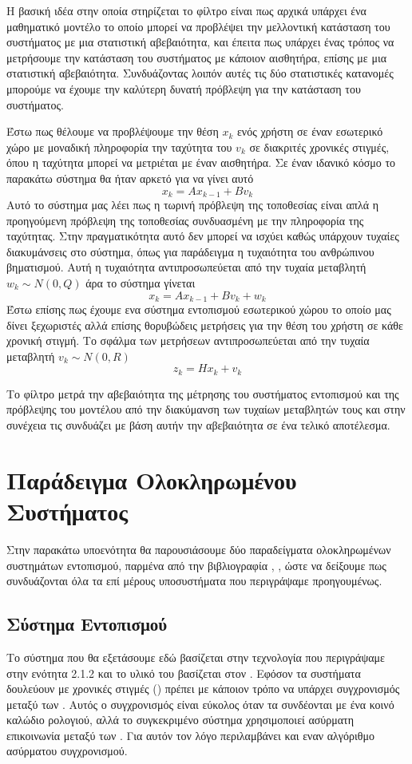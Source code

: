 Η βασική ιδέα στην οποία στηρίζεται το φίλτρο  είναι πως αρχικά υπάρχει ένα μαθηματικό μοντέλο το οποίο μπορεί να
προβλέψει την μελλοντική κατάσταση του συστήματος με μια στατιστική αβεβαιότητα, και έπειτα πως υπάρχει ένας τρόπος να μετρήσουμε την
κατάσταση του συστήματος με κάποιον αισθητήρα, επίσης με μια στατιστική αβεβαιότητα. Συνδυάζοντας λοιπόν αυτές τις δύο στατιστικές
κατανομές μπορούμε να έχουμε την καλύτερη δυνατή πρόβλεψη για την κατάσταση του συστήματος.

Έστω πως θέλουμε να προβλέψουμε την θέση \(x_k\) ενός χρήστη σε έναν εσωτερικό χώρο με μοναδική πληροφορία την ταχύτητα του \(v_k\) σε
διακριτές χρονικές στιγμές, όπου η ταχύτητα μπορεί να μετριέται με έναν αισθητήρα.
Σε έναν ιδανικό κόσμο το παρακάτω σύστημα θα ήταν αρκετό για να γίνει αυτό
\[x_k = Ax_{k-1} + Bv_k\]
Αυτό το σύστημα μας λέει πως η τωρινή πρόβλεψη της τοποθεσίας είναι απλά η προηγούμενη πρόβλεψη της τοποθεσίας συνδυασμένη με την
πληροφορία της ταχύτητας. Στην πραγματικότητα αυτό δεν μπορεί να ισχύει καθώς υπάρχουν τυχαίες διακυμάνσεις στο σύστημα, όπως για
παράδειγμα η τυχαιότητα του ανθρώπινου βηματισμού. Αυτή η τυχαιότητα αντιπροσωπεύεται από την τυχαία μεταβλητή \(w_k\sim N(0, Q)\)
άρα το σύστημα γίνεται
\[x_k = Ax_{k-1} + Bv_k + w_k\]
Έστω επίσης πως έχουμε ενα σύστημα εντοπισμού εσωτερικού χώρου το οποίο μας δίνει ξεχωριστές αλλά επίσης θορυβώδεις μετρήσεις για την
θέση του χρήστη σε κάθε χρονική στιγμή. Το σφάλμα των μετρήσεων αντιπροσωπεύεται από την τυχαία μεταβλητή \(v_k\sim N(0, R)\)
\[z_k = Hx_k + v_k\]

Το φίλτρο  μετρά την αβεβαιότητα της μέτρησης του συστήματος εντοπισμού και της πρόβλεψης του μοντέλου από την
διακύμανση των τυχαίων μεταβλητών τους και στην συνέχεια τις συνδυάζει με βάση αυτήν την αβεβαιότητα σε ένα τελικό αποτέλεσμα.

\section{Παράδειγμα Ολοκληρωμένου Συστήματος}
Στην παρακάτω υποενότητα θα παρουσιάσουμε δύο παραδείγματα ολοκληρωμένων συστημάτων εντοπισμού, παρμένα από την
βιβλιογραφία \cite{zhang}, \cite{girolami},
ώστε να δείξουμε πως συνδυάζονται όλα τα επί μέρους υποσυστήματα που περιγράψαμε προηγουμένως.

\subsection{Σύστημα Εντοπισμού }
Το σύστημα που θα εξετάσουμε εδώ βασίζεται στην τεχνολογία  που περιγράψαμε στην ενότητα 2.1.2 και το  υλικό του
βασίζεται στον .
Εφόσον τα συστήματα  δουλεύουν με χρονικές στιγμές () πρέπει με κάποιον τρόπο να υπάρχει συγχρονισμός
μεταξύ των . Αυτός ο συγχρονισμός είναι εύκολος όταν τα  συνδέονται με ένα κοινό καλώδιο ρολογιού, αλλά
το συγκεκριμένο σύστημα χρησιμοποιεί ασύρματη επικοινωνία μεταξύ των .
Για αυτόν τον λόγο περιλαμβάνει και εναν αλγόριθμο ασύρματου συγχρονισμού.

